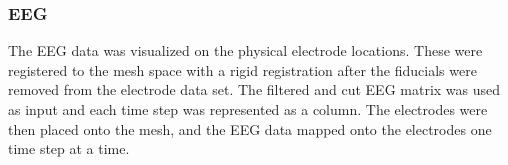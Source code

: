 \subsubsection{EEG}

The EEG data was visualized on the physical electrode locations. These were registered to the mesh space with a rigid registration after the fiducials were removed from the electrode data set. The filtered and cut EEG matrix was used as input and each time step was represented as a column. The electrodes were then placed onto the mesh, and the EEG data mapped onto the electrodes one time step at a time. 